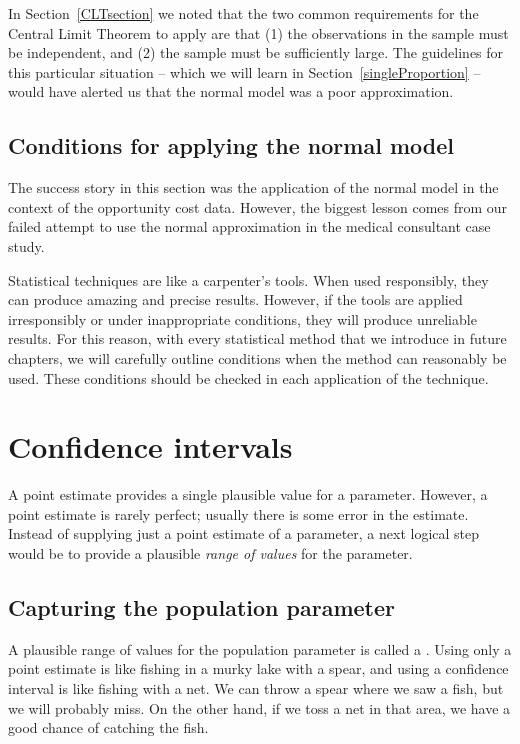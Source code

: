 In Section~\ref{CLTsection} we noted that the two common requirements for the Central Limit Theorem to apply are that (1) the observations in the sample must be independent, and (2) the sample must be sufficiently large. The guidelines for this particular situation -- which we will learn in Section~\ref{singleProportion} -- would have alerted us that the normal model was a poor approximation.


\subsection{Conditions for applying the normal model}

The success story in this section was the application of the normal model in the context of the opportunity cost data. However, the biggest lesson comes from our failed attempt to use the normal approximation in the medical consultant case study.

Statistical techniques are like a carpenter's tools. When used responsibly, they can produce amazing and precise results. However, if the tools are applied irresponsibly or under inappropriate conditions, they will produce unreliable results. For this reason, with every statistical method that we introduce in future chapters, we will carefully outline conditions when the method can reasonably be used. These conditions should be checked in each application of the technique.


\section{Confidence intervals}
\label{ConfidenceIntervals}


A point estimate provides a single plausible value for a parameter. However, a point estimate is rarely perfect; usually there is some error in the estimate. Instead of supplying just a point estimate of a parameter, a next logical step would be to provide a plausible \emph{range of values} for the parameter.


\subsection{Capturing the population parameter}

A plausible range of values for the population parameter is called a . Using only a point estimate is like fishing in a murky lake with a spear, and using a confidence interval is like fishing with a net. We can throw a spear where we saw a fish, but we will probably miss. On the other hand, if we toss a net in that area, we have a good chance of catching the fish.

